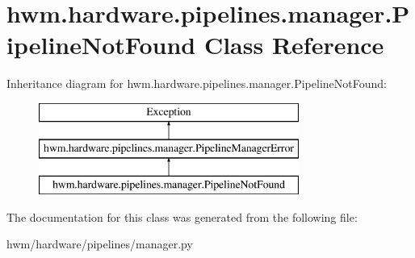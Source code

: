 \hypertarget{classhwm_1_1hardware_1_1pipelines_1_1manager_1_1_pipeline_not_found}{\section{hwm.\-hardware.\-pipelines.\-manager.\-Pipeline\-Not\-Found Class Reference}
\label{classhwm_1_1hardware_1_1pipelines_1_1manager_1_1_pipeline_not_found}
}
Inheritance diagram for hwm.\-hardware.\-pipelines.\-manager.\-Pipeline\-Not\-Found\-:\begin{figure}[H]
\begin{center}
\leavevmode
\includegraphics[height=3.000000cm]{classhwm_1_1hardware_1_1pipelines_1_1manager_1_1_pipeline_not_found}
\end{center}
\end{figure}


The documentation for this class was generated from the following file\-:\begin{DoxyCompactItemize}
\item 
hwm/hardware/pipelines/manager.\-py\end{DoxyCompactItemize}
